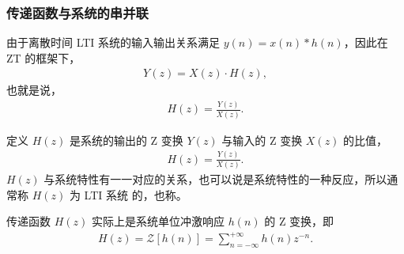 \subsubsection{传递函数与系统的串并联}

由于离散时间 LTI 系统的输入输出关系满足 $y(n) = x(n) * h(n)$，因此在 ZT 的框架下，
\begin{align*}
    Y(z) = X(z)\cdot H(z),
\end{align*}
也就是说，
\begin{align*}
    H(z) = \frac{Y(z)}{X(z)}.
\end{align*}

\begin{definition}[传递函数]
    定义 $H(z)$ 是系统的输出的 Z 变换 $Y(z)$ 与输入的 Z 变换 $X(z)$ 的比值，
    \begin{align*}
        H(z) = \frac{Y(z)}{X(z)}.
    \end{align*}
    $H(z)$ 与系统特性有一一对应的关系，也可以说是系统特性的一种反应，所以通常称 $H(z)$ 为 LTI 系统
    的，也称。
\end{definition}

\begin{remark}
    传递函数 $H(z)$ 实际上是系统单位冲激响应 $h(n)$ 的 Z 变换，即
    \begin{align*}
        H(z) = \mathcal{Z}[h(n)] = \sum_{n = -\infty}^{+\infty} h(n)z^{-n}.
    \end{align*}
\end{remark}

